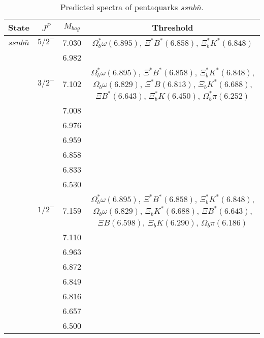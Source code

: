 \documentclass[prd,twocolumn,floatfix,nofootinbib]{revtex4}
\begin{document}
\renewcommand{\tabcolsep}{0.3cm}
\renewcommand{\arraystretch}{1.2}
\begin{table*}[!htbp]
    \caption{Predicted spectra of pentaquarks $ssnb\bar{n}$.}
    \begin{tabular}{cccc}
        \hline\hline
        {\rm State} &$J^{P}$ &$M_{bag}$ &Threshold \\ \hline
        $ssnb\bar{n}$
            &${5/2}^{-}$    &7.030  &$\Omega_{b}^{\ast}\omega(6.895)$, $\Xi^{\ast}B^{\ast}(6.858)$, $\Xi_{b}^{\ast}K^{\ast}(6.848)$ \\
            &               &6.982  & \\
            &${3/2}^{-}$    &7.102  &$\Omega_{b}^{\ast}\omega(6.895)$, $\Xi^{\ast}B^{\ast}(6.858)$, $\Xi_{b}^{\ast}K^{\ast}(6.848)$, $\Omega_{b}\omega(6.829)$, $\Xi^{\ast}B(6.813)$, $\Xi_{b}K^{\ast}(6.688)$, $\Xi B^{\ast}(6.643)$, $\Xi_{b}^{\ast}K(6.450)$, $\Omega_{b}^{\ast}\pi(6.252)$ \\
            &               &7.008  & \\
            &               &6.976  & \\
            &               &6.959  & \\
            &               &6.858  & \\
            &               &6.833  & \\
            &               &6.530  & \\
            &${1/2}^{-}$    &7.159  &$\Omega_{b}^{\ast}\omega(6.895)$, $\Xi^{\ast}B^{\ast}(6.858)$, $\Xi_{b}^{\ast}K^{\ast}(6.848)$, $\Omega_{b}\omega(6.829)$, $\Xi_{b}K^{\ast}(6.688)$, $\Xi B^{\ast}(6.643)$, $\Xi B(6.598)$, $\Xi_{b}K(6.290)$, $\Omega_{b}\pi(6.186)$ \\
            &               &7.110  & \\
            &               &6.963  & \\
            &               &6.872  & \\
            &               &6.849  & \\
            &               &6.816  & \\
            &               &6.657  & \\
            &               &6.500  & \\
        \hline\hline
    \end{tabular}
\end{table*}
\end{document}
